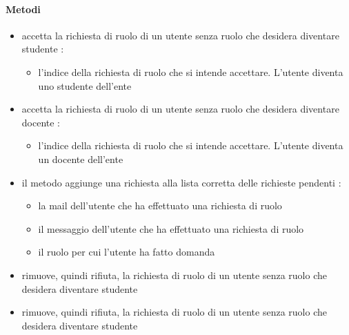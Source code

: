 \paragraph{Metodi}
\begin{itemize}
\item {}
\newline
accetta la richiesta di ruolo di un utente senza ruolo che desidera diventare studente
\newline
{} :
\begin{itemize}
\item {}
\newline
l'indice della richiesta di ruolo che si intende accettare. L'utente diventa uno studente dell'ente
\end{itemize}
\item {}
\newline
accetta la richiesta di ruolo di un utente senza ruolo che desidera diventare docente
\newline
{} :
\begin{itemize}
\item {}
\newline
l'indice della richiesta di ruolo che si intende accettare. L'utente diventa un docente dell'ente
\end{itemize}
\item {}
\newline
il metodo aggiunge una richiesta alla lista corretta delle richieste pendenti
\newline
{} :
\begin{itemize}
\item {}
\newline
la mail dell'utente che ha effettuato una richiesta di ruolo
\item {}
\newline
il messaggio dell'utente che ha effettuato una richiesta di ruolo
\item {}
\newline
il ruolo per cui l'utente ha fatto domanda
\end{itemize}
\item {}
\newline
rimuove, quindi rifiuta, la richiesta di ruolo di un utente senza ruolo che desidera diventare studente
\newline
\item {}
\newline
rimuove, quindi rifiuta, la richiesta di ruolo di un utente senza ruolo che desidera diventare studente
\newline
\end{itemize}
